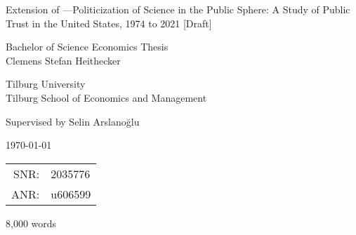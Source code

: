 \begin{titlepage}
\begin{center}

	\vspace*{\fill}
	
	\LARGE{Extension of \citet{gauchat-2012}---Politicization of Science in the Public Sphere: A Study of Public Trust in the United States, 1974 to 2021 [Draft]}
	
	\vspace{1.5cm}
	
	\large{
		Bachelor of Science Economics Thesis \\
		Clemens Stefan Heithecker
	}
	
	\vspace{1cm}
	
	\large{
		Tilburg University \\
		Tilburg School of Economics and Management
	}
	
	\vspace{1cm}
	
	\large{Supervised by Selin Arslanoğlu}
	
	\vspace{1cm}
	
	\large{\today}
	
	\vfill
	
	\small{
		\begin{tabular}{rl}
		SNR: & 2035776 \\
		ANR: & u606599
		\end{tabular}
		
		\vspace{0.5cm}		
		
		8,000 words
	}

\end{center}
\end{titlepage}
